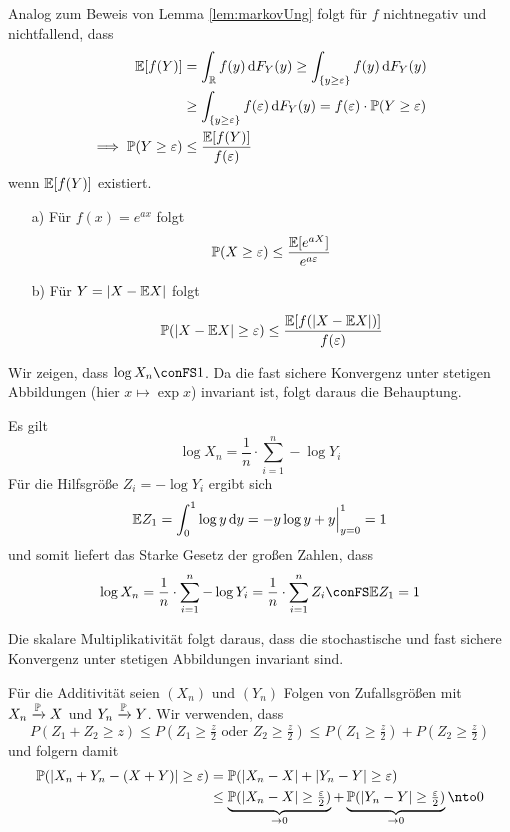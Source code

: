 \begin{loesung}
Analog zum Beweis von Lemma \ref{lem:markovUng} folgt für $f$ nichtnegativ und nichtfallend, dass
\begin{align*}
    \mathbb E[f(Y)] 
    &= \int_{\mathbb R} f(y) \mathop{}\!\mathrm{d} F_Y(y) 
    \geq \int_{\{y\geq \varepsilon\}} f(y) \mathop{}\!\mathrm{d} F_Y(y) \\
    &\geq \int_{\{y\geq \varepsilon\}} f(\varepsilon) \mathop{}\!\mathrm{d} F_Y(y) 
    = f(\varepsilon)\cdot\mathbb P(Y\geq \varepsilon) \\
    \implies \mathbb P(Y\geq \varepsilon) &\leq \dfrac{\mathbb E[f(Y)]}{f(\varepsilon)}
\end{align*} 
wenn $\mathbb E[f(Y)]$ existiert.
\begin{enumerate}
    \item[a)] Für $f(x)=e^{ax}$ folgt 
    \[
        \mathbb P(X\geq \varepsilon) \leq \dfrac{\mathbb E[e^{aX}]}{e^{a\varepsilon}}
    \]
    \item[b)] Für $Y=|X-\mathbb E X|$ folgt
    \item[] \[
        \mathbb P(|X-\mathbb E X|\geq \varepsilon) \leq \dfrac{\mathbb E[f(|X-\mathbb E X|)]}{f(\varepsilon)}
    \]
\end{enumerate}
\end{loesung}

\begin{loesung}
Wir zeigen, dass $\log X_n \conFS 1$. Da die fast sichere Konvergenz unter stetigen Abbildungen 
(hier $x\mapsto \exp x$) invariant ist, folgt daraus die Behauptung. 

Es gilt 
\[
    \log X_n = \dfrac{1}{n}\cdot\sum_{i=1}^{n} -\log Y_i
\]
Für die Hilfsgröße $Z_i = -\log Y_i$ ergibt sich 
\[
    \mathbb E Z_1 = \int_{0}^{1} \log y \mathop{}\!\mathrm{d} y = -y\log y + y\Big|_{y=0}^1 = 1 
\]
und somit liefert das Starke Gesetz der großen Zahlen, dass 
\[
    \log X_n = \dfrac{1}{n}\cdot\sum_{i=1}^{n} -\log Y_i = \dfrac{1}{n}\cdot\sum_{i=1}^{n} Z_i \conFS \E Z_1 = 1
\]
\end{loesung}

\begin{loesung}
Die skalare Multiplikativität folgt daraus, dass die stochastische und fast sichere Konvergenz unter 
stetigen Abbildungen invariant sind.

Für die Additivität seien $(X_n)$ und $(Y_n)$ Folgen von Zufallsgrößen mit $X_n\xrightarrow{\mathbb P} X$ und $Y_n\xrightarrow{\mathbb P} Y$. 
Wir verwenden, dass 
\[
    P(Z_1+Z_2\geq z) 
    \leq P(Z_1\geq \tfrac{z}{2}\text{ oder }Z_2\geq \tfrac{z}{2}) 
    \leq P(Z_1\geq \tfrac{z}{2}) + P(Z_2\geq \tfrac{z}{2})
\]
und folgern damit
\begin{align*}
    \P(|X_n+Y_n - (X+Y)|\geq \varepsilon) 
    &= \P(|X_n-X| + |Y_n-Y|\geq \varepsilon) \\
    &\leq
    \underbrace{\P(|X_n-X| \geq \tfrac{\varepsilon}{2})}_{\to 0} 
    + \underbrace{\P(|Y_n-Y| \geq \tfrac{\varepsilon}{2})}_{\to 0} \nto 0
\end{align*}
\end{loesung}

